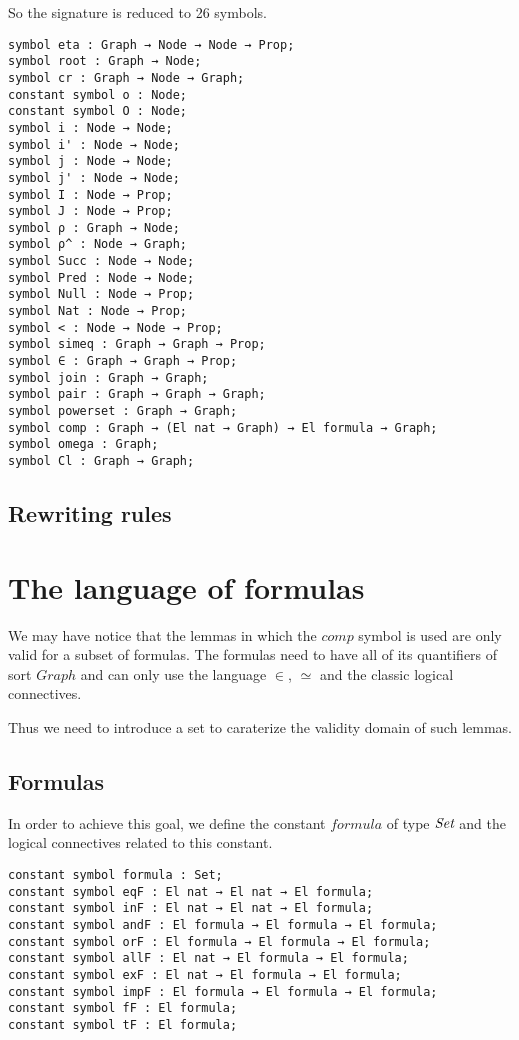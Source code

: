 \documentclass[a4paper]{article}
\begin{document}
So the signature is reduced to 26 symbols. 

\begin{lstlisting}
symbol eta : Graph → Node → Node → Prop;
symbol root : Graph → Node;
symbol cr : Graph → Node → Graph;
constant symbol o : Node;
constant symbol O : Node;
symbol i : Node → Node;
symbol i' : Node → Node;
symbol j : Node → Node;
symbol j' : Node → Node;
symbol I : Node → Prop;
symbol J : Node → Prop;
symbol ρ : Graph → Node;
symbol ρ^ : Node → Graph;
symbol Succ : Node → Node;
symbol Pred : Node → Node;
symbol Null : Node → Prop;
symbol Nat : Node → Prop;
symbol < : Node → Node → Prop;
symbol simeq : Graph → Graph → Prop;
symbol ∈ : Graph → Graph → Prop;
symbol join : Graph → Graph;
symbol pair : Graph → Graph → Graph;
symbol powerset : Graph → Graph;
symbol comp : Graph → (El nat → Graph) → El formula → Graph;
symbol omega : Graph;
symbol Cl : Graph → Graph;
\end{lstlisting}

\subsection{Rewriting rules}


\section{The language of formulas}

We may have notice that the lemmas in which the $comp$ symbol is used are only valid for a subset of formulas. The formulas need to have all of its quantifiers of sort $Graph$ and can only use the language $\in$, $\simeq$ and the classic logical connectives.

Thus we need to introduce a set to caraterize the validity domain of such lemmas.

\subsection{Formulas}

In order to achieve this goal, we define the constant $formula$ of type $\mbox{\it Set}$ and the logical connectives related to this constant.

\begin{lstlisting}
constant symbol formula : Set;
constant symbol eqF : El nat → El nat → El formula;
constant symbol inF : El nat → El nat → El formula;
constant symbol andF : El formula → El formula → El formula;
constant symbol orF : El formula → El formula → El formula;
constant symbol allF : El nat → El formula → El formula;
constant symbol exF : El nat → El formula → El formula;
constant symbol impF : El formula → El formula → El formula;
constant symbol fF : El formula;
constant symbol tF : El formula;
\end{lstlisting}
\end{document}
